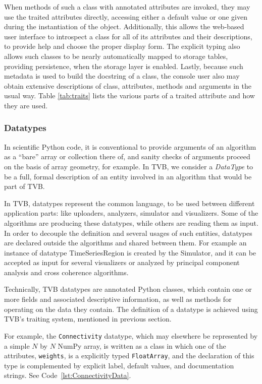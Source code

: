 \documentclass{bioinfo}
\begin{document}
When methods of such a class with annotated attributes are invoked, they may use
the traited attributes directly, accessing either a default value or one given
during the instantiation of the object. Additionally, this allows the web-based
user interface to introspect a class for all of its attributes and their
descriptions, to provide help and choose the proper display form. The explicit
typing also allows such classes to be nearly automatically mapped to storage
tables, providing persistence, when the storage layer is enabled.  Lastly,
because such metadata is used to build the docstring of a class, the console
user also may obtain extensive descriptions of class, attributes, methods and
arguments in the usual way. Table \ref{tab:traits} lists the various parts 
of a traited attribute and how they are used. 


\subsubsection{Datatypes}

In scientific Python code, it is conventional to provide arguments
of an algorithm as a ``bare'' array or collection there of, and sanity
checks of arguments proceed on the basis of array geometry, for example.
In TVB, we consider a \textit{DataType} to be a full, formal description of 
an entity involved in an algorithm that would be part of TVB. 

In TVB, datatypes represent the common language, to be used between different
application parts: like uploaders, analyzers, simulator and visualizers.
Some of the algorithms are producing these datatypes, while others are reading
them as input.  In order to decouple the definition and several usages of such
entities, datatypes are declared outside the algorithms and shared between them.
For example an instance of datatype TimeSeriesRegion is created by the
Simulator, and it can be accepted as input for several visualizers or analyzed
by principal component analysis and cross coherence algorithms.

Technically, TVB datatypes are annotated Python classes, which
contain one or more fields and associated descriptive information, as
well as methods for operating on the data they contain. The definition of a
datatype is achieved using TVB's traiting system, mentioned in previous section.

For example, the \texttt{Connectivity} datatype, which may elsewhere
be represented by a simple $N$ by $N$ NumPy array, is written as a class
in which one of the attributes, \texttt{weights}, is a explicitly typed 
\texttt{FloatArray}, and the declaration of this type is complemented by
explicit label, default values, and documentation strings. See
Code~\ref{lst:ConnectivityData}.
\end{document}
